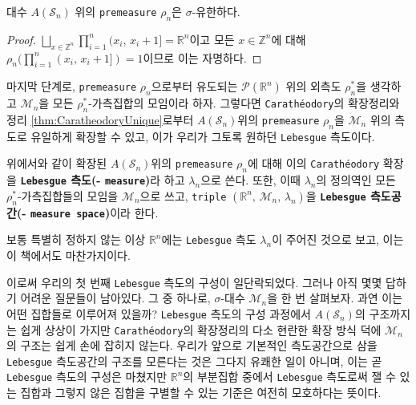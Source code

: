 \begin{proposition}
    대수 $A(\mathcal{S}_n)$ 위의 \texttt{premeasure} $\rho_n$은 $\sigma$-유한하다.
\end{proposition}

\begin{proof}
    $\bigsqcup_{x\in\mathbb{Z}^n}\prod_{i=1}^n(x_i,\,x_i+1]=\mathbb{R}^n$이고 모든 $x\in\mathbb{Z}^n$에 대해 $\rho_n(\prod_{i=1}^n(x_i,\,x_i+1])=1$이므로 이는 자명하다.
\end{proof}

마지막 단계로, \texttt{premeasure} $\rho_n$으로부터 유도되는 $\mathcal{P}(\mathbb{R}^n)$ 위의 외측도 $\rho_n^*$을 생각하고 $\mathcal{M}_n$을 모든 $\rho_n^*$-가측집합의 모임이라 하자. 그렇다면 \texttt{Carath\'eodory}의 확장정리와 정리 \ref{thm:CaratheodoryUnique}로부터 $A(\mathcal{S}_n)$위의 \texttt{premeasure} $\rho_n$을 $\mathcal{M}_n$ 위의 측도로 유일하게 확장할 수 있고, 이가 우리가 그토록 원하던 \texttt{Lebesgue} 측도이다.

\begin{definition}
    위에서와 같이 확장된 $A(\mathcal{S}_n)$위의 \texttt{premeasure} $\rho_n$에 대해 이의 \texttt{Carath\'eodory} 확장을 \textbf{\texttt{Lebesgue} 측도(- \texttt{measure})}라 하고 $\lambda_n$으로 쓴다. 또한, 이때 $\lambda_n$의 정의역인 모든 $\rho_n^*$-가측집합들의 모임을 $\mathcal{M}_n$으로 쓰고, \texttt{triple} $(\mathbb{R}^n,\,\mathcal{M}_n,\,\lambda_n)$을 \textbf{\texttt{Lebesgue} 측도공간(- \texttt{measure space})}이라 한다.
\end{definition}

보통 특별히 정하지 않는 이상 $\mathbb{R}^n$에는 \texttt{Lebesgue} 측도 $\lambda_n$이 주어진 것으로 보고, 이는 이 책에서도 마찬가지이다.

이로써 우리의 첫 번째 \texttt{Lebesgue} 측도의 구성이 일단락되었다. 그러나 아직 몇몇 답하기 어려운 질문들이 남아있다. 그 중 하나로, $\sigma$-대수 $\mathcal{M}_n$을 한 번 살펴보자. 과연 이는 어떤 집합들로 이루어져 있을까? \texttt{Lebesgue} 측도의 구성 과정에서 $A(\mathcal{S}_n)$의 구조까지는 쉽게 상상이 가지만 \texttt{Carath\'eodory}의 확장정리의 다소 현란한 확장 방식 덕에 $\mathcal{M}_n$의 구조는 쉽게 손에 잡히지 않는다. 우리가 앞으로 기본적인 측도공간으로 삼을 \texttt{Lebesgue} 측도공간의 구조를 모른다는 것은 그다지 유쾌한 일이 아니며, 이는 곧 \texttt{Lebesgue} 측도의 구성은 마쳤지만 $\mathbb{R}^n$의 부분집합 중에서 \texttt{Lebesgue} 측도로써 잴 수 있는 집합과 그렇지 않은 집합을 구별할 수 있는 기준은 여전히 모호하다는 뜻이다.

